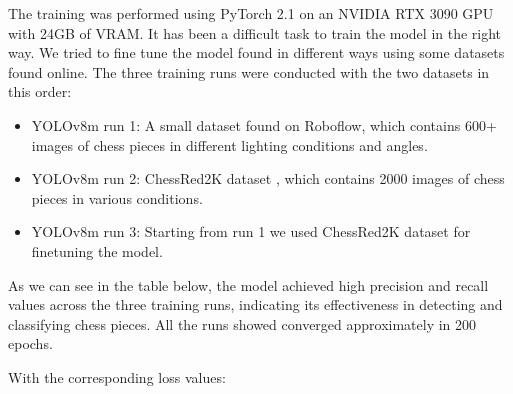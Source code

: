 The training was performed using PyTorch 2.1 on an NVIDIA RTX 3090 GPU with 24GB of VRAM.
\newline
It has been a difficult task to train the model in the right way.
We tried to fine tune the model found in different ways using some datasets found online.
The three training runs were conducted with the two datasets in this order:
\begin{itemize}
    \item YOLOv8m run 1: A small dataset found on Roboflow, which contains 600+ images of chess pieces in different lighting conditions and angles. \cite{cpd:dataset:yolosmall}
    \item YOLOv8m run 2: ChessRed2K dataset \cite{cpd:dataset:chessred2k}, which contains 2000 images of chess pieces in various conditions.
    \item YOLOv8m run 3: Starting from run 1 we used ChessRed2K dataset for finetuning the model.
\end{itemize}

As we can see in the table below, the model achieved high precision and recall values across the three training runs,
indicating its effectiveness in detecting and classifying chess pieces.
All the runs showed converged approximately in 200 epochs.
\begin{table}[ht]
\centering
\caption{Key performance metrics for the three YOLOv8m training runs.}
\label{tab:YOLOv8-results}
\end{table}

With the corresponding loss values:
\begin{table}[ht]
\centering
\caption{Loss values for the three YOLOv8m runs. All values are approximate and taken at convergence (step $\sim$200).}
\label{tab:yolov8-loss}
\end{table}


